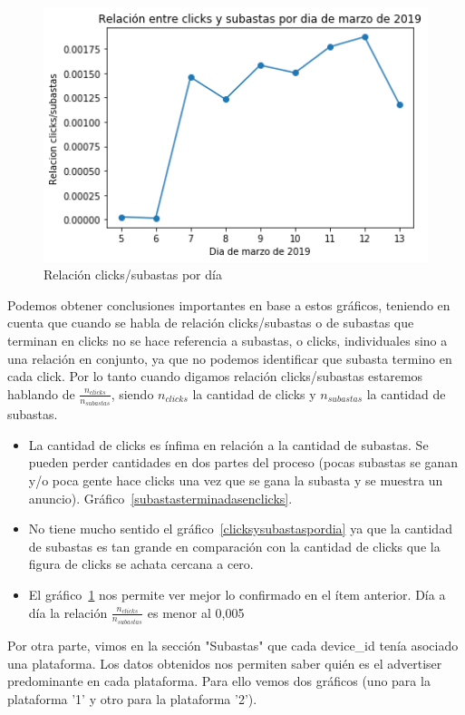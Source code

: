 \documentclass[a4paper, 12pt]{article}
\begin{document}
		\begin{figure}[h]
			\centering
			\includegraphics[width=350pt]{images/auctions-clicks/relauctionsclickspordia.png}
			\caption{Relación clicks/subastas por día}
			\label{relclickssubastas}
		\end{figure}
	\FloatBarrier

	 Podemos obtener conclusiones importantes en base a estos gráficos, teniendo en cuenta que cuando se habla de relación clicks/subastas o de subastas que terminan en clicks no se hace referencia a subastas, o clicks, individuales sino a una relación en conjunto, ya que no podemos identificar que subasta termino en cada click. Por lo tanto cuando digamos relación clicks/subastas estaremos hablando de $\frac{n_{clicks}}{n_{subastas}}$, siendo $n_{clicks}$ la cantidad de clicks y $n_{subastas}$ la cantidad de subastas.
	\begin{itemize}
		\item La cantidad de clicks es ínfima en relación a la cantidad de subastas. Se pueden perder cantidades en dos partes del proceso (pocas subastas se ganan  y/o poca gente hace clicks una vez que se gana la subasta y se muestra un anuncio). Gráfico~\ref{subastasterminadasenclicks}.
		\item No tiene mucho sentido el gráfico~\ref{clicksysubastaspordia} ya que la cantidad de subastas es tan grande en comparación con la cantidad de clicks que la figura de clicks se achata cercana a cero.
		\item El gráfico~\ref{relclickssubastas} nos permite ver mejor lo confirmado en el ítem anterior. Día a día la relación $\frac{n_{clicks}}{n_{subastas}}$ es menor al 0,005%
	\end{itemize}

	 Por otra parte, vimos en la sección "Subastas" que cada device\_id tenía asociado una plataforma. Los datos obtenidos nos permiten saber quién es el advertiser predominante en cada plataforma. Para ello vemos dos gráficos (uno para la plataforma '1' y otro para la plataforma '2').
\end{document}
